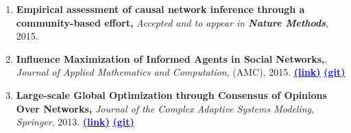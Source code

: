 \documentclass[letter]{res}
\begin{document}
\begin{resume}
\begin{enumerate}[leftmargin=-.01in]
			\item \textbf{Empirical assessment of causal network inference through a community-based effort,} \textit{Accepted and to appear in \textbf{Nature Methods}}, 2015.
			
			\item \textbf{Influence Maximization of Informed Agents in Social Networks,}, \textit{Journal of Applied Mathematics and Computation}, (AMC), 2015.
			{\href{http://dx.doi.org/10.1016/j.amc.2014.12.139}{\textbf{\textcolor{blue}{(link)}}}}
			{\href{https://github.com/omid55/influence_maximization}{\textbf{\textcolor{blue}{(git)}}}}
			
			\item \textbf{Large-scale Global Optimization through Consensus of Opinions Over Networks,} \textit{Journal of the Complex Adaptive Systems Modeling}, \textit{Springer}, 2013.
			{\href{http://www.casmodeling.com/content/1/1/11}{\textbf{\textcolor{blue}{(link)}}}}
			{\href{https://github.com/omid55/optimization_opinion_formation}{\textbf{\textcolor{blue}{(git)}}}}
			

\end{enumerate}
\end{resume}
\end{document}
